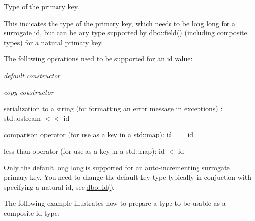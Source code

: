 Type of the primary key. 

This indicates the type of the primary key, which needs to be {\ttfamily long long} for a surrogate id, but can be any type supported by \hyperlink{namespacedbo_ad1f50f02cb050acf946807959252a93f}{dbo\+::field()} (including composite types) for a natural primary key.

The following operations need to be supported for an id value\+:


\begin{DoxyItemize}
\item {\itshape default constructor}
\item {\itshape copy constructor}
\item serialization to a string (for formatting an error message in exceptions) \+: {\ttfamily std\+::ostream $<$$<$ id}
\item comparison operator (for use as a key in a std\+::map)\+: {\ttfamily id == id}
\item less than operator (for use as a key in a std\+::map)\+: {\ttfamily id $<$ id}
\end{DoxyItemize}

Only the default {\ttfamily long long} is supported for an auto-\/incrementing surrogate primary key. You need to change the default key type typically in conjuction with specifying a natural id, see \hyperlink{namespacedbo_a8d25907296ae8360b3120b7492022c1d}{dbo\+::id()}.

The following example illustrates how to prepare a type to be usable as a composite id type\+:


